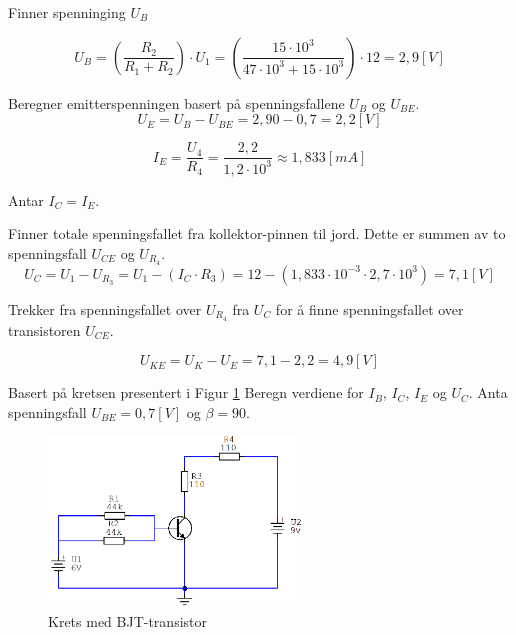 \begin{solution}[name=Løsningsforslag oppgave]
Finner spenninging $U_B$

\[U_B= \left(\frac{R_2}{R_1+R_2} \right) \cdot U_1 = \left(\frac{15 \cdot 10^3}{47 \cdot 10^3 + 15 \cdot 10^3} \right) \cdot 12 = 2,9 [V]\]

Beregner emitterspenningen basert på spenningsfallene  $U_B$ og $U_{BE}$.
\[U_E = U_B - U_{BE}=2,90-0,7=2,2 [V]\]

\[I_E = \frac{U_4}{R_4}=\frac{2,2}{1,2 \cdot 10^3} \approx 1,833 [mA]\]

Antar $I_C = I_E$.

Finner totale spenningsfallet fra kollektor-pinnen til jord. Dette er summen av to spenningsfall $U_{CE}$ og $U_{R_{4}}$.
\[U_C = U_1-U_{R_{3}}=U_1-(I_C \cdot R_3)=12-(1,833 \cdot 10^{-3} \cdot 2,7 \cdot 10^{3})=7,1 [V]\]

Trekker fra spenningsfallet over $U_{R_{4}}$ fra $U_C$ for å finne spenningsfallet over transistoren $U_{CE}$.

\[U_{KE} = U_K-U_E=7,1-2,2=4,9 [V]\]

\end{solution}

\vspace{0.5cm} %


\begin{question}[name=Oppgave, topic=transBJT]
	Basert på kretsen presentert i Figur \ref{fig:tranBJT4} Beregn verdiene for $I_B$, $I_C$, $I_E$ og $U_C$. Anta spenningsfall $U_{BE}=0,7[V]$ og $\beta=90$.
	
	\begin{figure}[H]
		\centering
		\includegraphics[width=0.6\textwidth]{transistor-BJT/figurer/krets4.png}
		\caption{Krets med BJT-transistor}
		\label{fig:tranBJT4}
	\end{figure}
	
\end{question}

